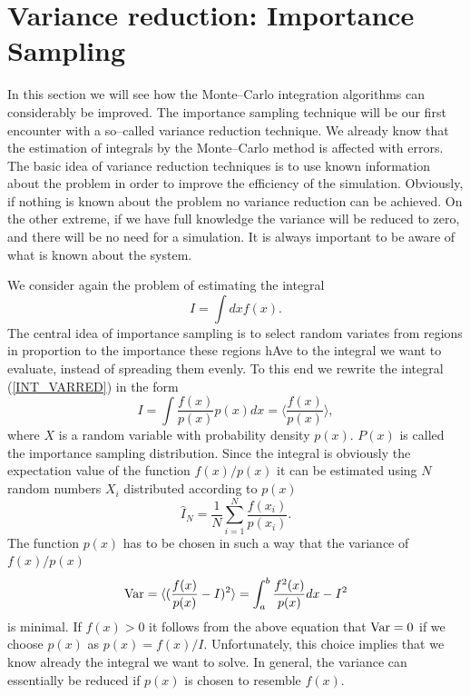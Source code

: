 
\section{Variance reduction: Importance Sampling}
In this section we will see how the Monte--Carlo integration
algorithms can considerably be improved. The importance sampling 
technique will be our first encounter with a so--called variance 
reduction technique. We already know that the estimation of 
integrals by the Monte--Carlo method is affected with errors. The
basic idea of variance reduction techniques is to use known 
information about the problem in order to improve the efficiency 
of the simulation. Obviously, if nothing is known about the 
problem no variance reduction can be achieved. On the other 
extreme, if we have full knowledge the variance will be reduced to 
zero, and there will be no need for a simulation. It is always 
important to be aware of what is known about the system.

We consider again the problem of estimating the integral
\begin{equation}
\label{INT_VARRED}
I = \int dx f(x).
\end{equation}
The central idea of importance sampling is to select random 
variates from regions in proportion to the importance these 
regions hAve to the integral we want to evaluate, instead of 
spreading them evenly. To this end we rewrite the integral 
(\ref{INT_VARRED}) in the form
\begin{equation*}
I = \int \frac{f(x)}{p(x)} p(x) dx = \langle 
\frac{f(x)}{p(x)}\rangle,
\end{equation*}
where $X$ is a random variable with probability density $p(x)$.
$P(x)$ is called the importance sampling distribution.  Since the
integral is obviously the expectation value of the function $f(x)/p(x)$
it can be estimated using $N$ random numbers $X_i$ distributed 
according to $p(x)$
\begin{equation*}
\hat{I}_N = \frac{1}{N} \sum_{i=1}^N \frac{f(x_i)}{p(x_i)}.
\end{equation*}
The function $p(x)$ has to be chosen in such a way that the 
variance of $f(x)/p(x)$ 
\begin{equation*}
{\rm Var} = \langle (\frac{f(x)}{p(x)}-I)^2\rangle
   = \int_a^b \frac{f^2(x)}{p(x)}dx - I^2
\end{equation*}
is minimal. If $f(x)>0$ it follows from the above equation that
${\rm Var}=0$ if we choose $p(x)$ as $p(x) = f(x)/I$. 
Unfortunately, this choice implies that we know already 
the integral we want to solve. In general, the variance can 
essentially be reduced if $p(x)$ is chosen to resemble $f(x)$.

